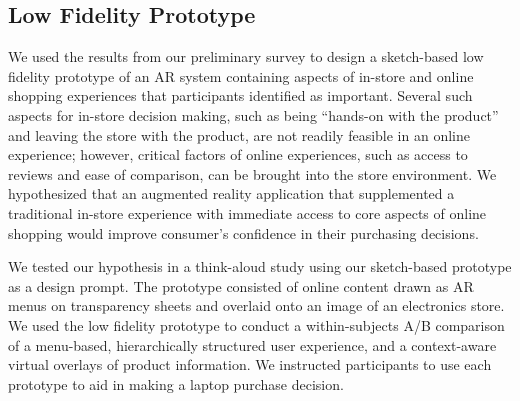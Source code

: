 \subsection{Low Fidelity Prototype}
We used the results from our preliminary survey to design a sketch-based low fidelity prototype of an AR system containing aspects of in-store and online shopping experiences that participants identified as important. Several such aspects for in-store decision making, such as being ``hands-on with the product'' and leaving the store with the product, are not readily feasible in an online experience; however, critical factors of online experiences, such as access to reviews and ease of comparison, can be brought into the store environment.  We hypothesized that an augmented reality application that supplemented a traditional in-store experience with immediate access to core aspects of online shopping would improve consumer's confidence in their purchasing decisions. 

We tested our hypothesis in a think-aloud study using our sketch-based prototype as a design prompt.  The prototype consisted of online content drawn as AR menus on transparency sheets and overlaid onto an image of an electronics store. We used the low fidelity prototype to conduct a within-subjects A/B comparison of a menu-based, hierarchically structured user experience, and a context-aware virtual overlays of product information.    We instructed participants to use each prototype to aid in making a laptop purchase decision.  

